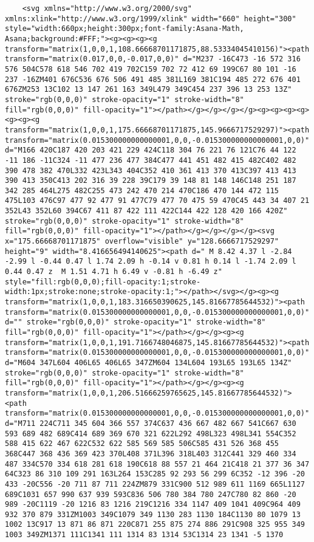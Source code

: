\documentclass[
]{article}
\begin{document}
\begin{verbatim}
    <svg xmlns="http://www.w3.org/2000/svg" xmlns:xlink="http://www.w3.org/1999/xlink" width="660" height="300" style="width:660px;height:300px;font-family:Asana-Math, Asana;background:#FFF;"><g><g><g><g transform="matrix(1,0,0,1,108.66668701171875,88.53334045410156)"><path transform="matrix(0.017,0,0,-0.017,0,0)" d="M237 -16C473 -16 572 316 576 504C578 618 546 702 419 702C159 702 72 412 69 199C67 80 101 -16 237 -16ZM401 676C536 676 506 491 485 381L169 381C194 485 272 676 401 676ZM253 13C102 13 147 261 163 349L479 349C454 237 396 13 253 13Z" stroke="rgb(0,0,0)" stroke-opacity="1" stroke-width="8" fill="rgb(0,0,0)" fill-opacity="1"></path></g></g></g></g><g><g><g><g><g><g><g transform="matrix(1,0,0,1,175.66668701171875,145.9666717529297)"><path transform="matrix(0.015300000000000001,0,0,-0.015300000000000001,0,0)" d="M166 420C187 420 203 421 229 424C118 304 76 221 76 121C76 44 122 -11 186 -11C324 -11 477 236 477 384C477 441 451 482 415 482C402 482 390 478 382 470L332 423L343 404C352 410 361 413 370 413C397 413 413 390 413 350C413 202 316 39 228 39C179 39 148 81 148 146C148 251 187 342 285 464L275 482C255 473 242 470 214 470C186 470 144 472 115 475L103 476C97 477 92 477 91 477C79 477 70 475 59 470C45 443 34 407 21 352L43 352L60 394C67 411 87 422 111 422C144 422 128 420 166 420Z" stroke="rgb(0,0,0)" stroke-opacity="1" stroke-width="8" fill="rgb(0,0,0)" fill-opacity="1"></path></g></g></g></g><svg x="175.66668701171875" overflow="visible" y="128.6666717529297" height="9" width="8.416656494140625"><path d=" M 8.42 4.37 l -2.84 -2.99 l -0.44 0.47 l 1.74 2.09 h -0.14 v 0.81 h 0.14 l -1.74 2.09 l 0.44 0.47 z  M 1.51 4.71 h 6.49 v -0.81 h -6.49 z" style="fill:rgb(0,0,0);fill-opacity:1;stroke-width:1px;stroke:none;stroke-opacity:1;"></path></svg></g><g><g transform="matrix(1,0,0,1,183.316650390625,145.81667785644532)"><path transform="matrix(0.015300000000000001,0,0,-0.015300000000000001,0,0)" d="" stroke="rgb(0,0,0)" stroke-opacity="1" stroke-width="8" fill="rgb(0,0,0)" fill-opacity="1"></path></g></g><g><g transform="matrix(1,0,0,1,191.7166748046875,145.81667785644532)"><path transform="matrix(0.015300000000000001,0,0,-0.015300000000000001,0,0)" d="M604 347L604 406L65 406L65 347ZM604 134L604 193L65 193L65 134Z" stroke="rgb(0,0,0)" stroke-opacity="1" stroke-width="8" fill="rgb(0,0,0)" fill-opacity="1"></path></g></g><g><g transform="matrix(1,0,0,1,206.51666259765625,145.81667785644532)"><path transform="matrix(0.015300000000000001,0,0,-0.015300000000000001,0,0)" d="M711 224C711 345 604 366 557 374C637 436 667 482 667 541C667 630 593 689 482 689C414 689 369 670 321 622L292 498L323 498L341 554C352 588 415 622 467 622C532 622 585 569 585 506C585 431 526 368 455 368C447 368 436 369 423 370L408 371L396 318L403 312C441 329 460 334 487 334C570 334 618 281 618 190C618 88 557 21 464 21C418 21 377 36 347 64C323 86 310 109 291 163L264 153C285 92 293 56 299 6C352 -12 396 -20 433 -20C556 -20 711 87 711 224ZM879 331C900 512 989 611 1169 665L1127 689C1031 657 990 637 939 593C836 506 780 384 780 247C780 82 860 -20 989 -20C1119 -20 1216 83 1216 219C1216 334 1147 409 1041 409C964 409 932 370 879 331ZM1003 349C1079 349 1130 283 1130 184C1130 80 1079 13 1002 13C917 13 871 86 871 220C871 255 875 274 886 291C908 325 955 349 1003 349ZM1371 111C1341 111 1314 83 1314 53C1314 23 1341 -5 1370 
\end{verbatim}
\end{document}
